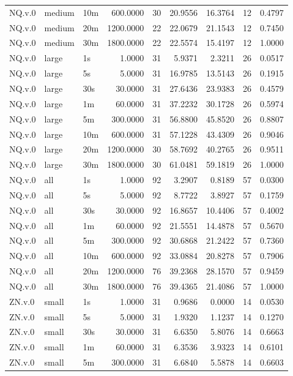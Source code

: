 \begin{tabular}{lllrrrrrr}
NQ.v.0 & medium & 10m & 600.0000 & 30 & 20.9556 & 16.3764 & 12 & 0.4797 \\
NQ.v.0 & medium & 20m & 1200.0000 & 22 & 22.0679 & 21.1543 & 12 & 0.7450 \\
NQ.v.0 & medium & 30m & 1800.0000 & 22 & 22.5574 & 15.4197 & 12 & 1.0000 \\
NQ.v.0 & large & 1s & 1.0000 & 31 & 5.9371 & 2.3211 & 26 & 0.0517 \\
NQ.v.0 & large & 5s & 5.0000 & 31 & 16.9785 & 13.5143 & 26 & 0.1915 \\
NQ.v.0 & large & 30s & 30.0000 & 31 & 27.6436 & 23.9383 & 26 & 0.4579 \\
NQ.v.0 & large & 1m & 60.0000 & 31 & 37.2232 & 30.1728 & 26 & 0.5974 \\
NQ.v.0 & large & 5m & 300.0000 & 31 & 56.8800 & 45.8520 & 26 & 0.8807 \\
NQ.v.0 & large & 10m & 600.0000 & 31 & 57.1228 & 43.4309 & 26 & 0.9046 \\
NQ.v.0 & large & 20m & 1200.0000 & 30 & 58.7692 & 40.2765 & 26 & 0.9511 \\
NQ.v.0 & large & 30m & 1800.0000 & 30 & 61.0481 & 59.1819 & 26 & 1.0000 \\
NQ.v.0 & all & 1s & 1.0000 & 92 & 3.2907 & 0.8189 & 57 & 0.0300 \\
NQ.v.0 & all & 5s & 5.0000 & 92 & 8.7722 & 3.8927 & 57 & 0.1759 \\
NQ.v.0 & all & 30s & 30.0000 & 92 & 16.8657 & 10.4406 & 57 & 0.4002 \\
NQ.v.0 & all & 1m & 60.0000 & 92 & 21.5551 & 14.4878 & 57 & 0.5670 \\
NQ.v.0 & all & 5m & 300.0000 & 92 & 30.6868 & 21.2422 & 57 & 0.7360 \\
NQ.v.0 & all & 10m & 600.0000 & 92 & 33.0884 & 20.8278 & 57 & 0.7906 \\
NQ.v.0 & all & 20m & 1200.0000 & 76 & 39.2368 & 28.1570 & 57 & 0.9459 \\
NQ.v.0 & all & 30m & 1800.0000 & 76 & 39.4365 & 21.4086 & 57 & 1.0000 \\
ZN.v.0 & small & 1s & 1.0000 & 31 & 0.9686 & 0.0000 & 14 & 0.0530 \\
ZN.v.0 & small & 5s & 5.0000 & 31 & 1.9320 & 1.1237 & 14 & 0.1270 \\
ZN.v.0 & small & 30s & 30.0000 & 31 & 6.6350 & 5.8076 & 14 & 0.6663 \\
ZN.v.0 & small & 1m & 60.0000 & 31 & 6.3536 & 3.9323 & 14 & 0.6101 \\
ZN.v.0 & small & 5m & 300.0000 & 31 & 6.6840 & 5.5878 & 14 & 0.6603 \\

\end{tabular}
